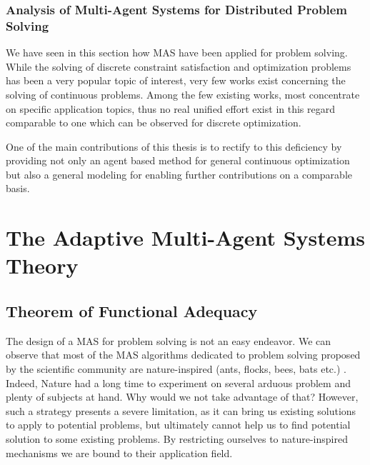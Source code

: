 \subsubsection{Analysis of Multi-Agent Systems for Distributed Problem Solving}

We have seen in this section how MAS have been applied for problem solving. While the solving of discrete constraint satisfaction and optimization problems has been a very popular topic of interest, very few works exist concerning the solving of continuous problems. Among the few existing works, most concentrate on specific application topics, thus no real unified effort exist in this regard comparable to one which can be observed for discrete optimization.

One of the main contributions of this thesis is to rectify to this deficiency by providing not only an agent based method for general continuous optimization but also a general modeling for enabling further contributions on a comparable basis.

\section{The Adaptive Multi-Agent Systems Theory}\label{amas_theory}

\subsection{Theorem of Functional Adequacy}

The design of a MAS for problem solving is not an easy endeavor. We can observe that most of the MAS algorithms dedicated to problem solving proposed by the scientific community are nature-inspired (ants, flocks, bees, bats etc.) \cite{di2011self}. Indeed, Nature had a long time to experiment on several arduous problem and plenty of subjects at hand. Why would we not take advantage of that? However, such a strategy presents a severe limitation, as it can bring us existing solutions to apply to potential problems, but ultimately cannot help us to find potential solution to some existing problems. By restricting ourselves to nature-inspired mechanisms we are bound to their application field.\\

